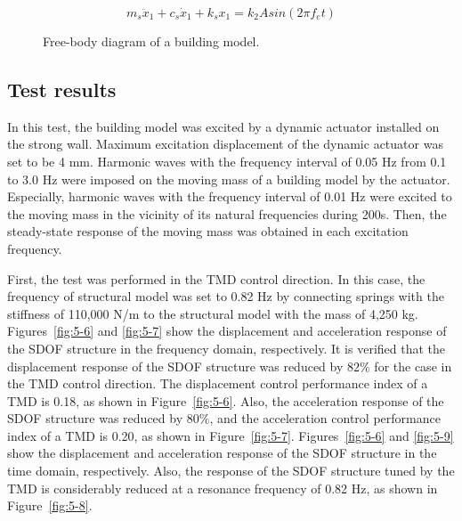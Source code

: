 \begin{equation}\label{eq:5-5}
m_{s}\ddot{x}_{1}+c_{s}\dot{x}_{1}+k_{s}x_{1} = k_{2}A sin \left(2 \pi f_{e} t \right)
\end{equation}

\begin{figure}[!ht]
\centering
{}
\caption{Free-body diagram of a building model.}
\label{fig:5-5}
\end{figure}

\subsection{Test results}
In this test, the building model was excited by a dynamic actuator installed on the strong wall. Maximum excitation displacement of the dynamic actuator was set to be 4 mm. Harmonic waves with the frequency interval of 0.05 Hz from 0.1 to 3.0 Hz were imposed on the moving mass of a building model by the actuator. Especially, harmonic waves with the frequency interval of 0.01 Hz were excited to the moving mass in the vicinity of its natural frequencies during 200s. Then, the steady-state response of the moving mass was obtained in each excitation frequency.

First, the test was performed in the TMD control direction. In this case, the frequency of structural model was set to 0.82 Hz by connecting springs with the stiffness of 110,000 N/m to the structural model with the mass of 4,250 kg. Figures~\ref{fig:5-6} and \ref{fig:5-7} show the displacement and acceleration response of the SDOF structure in the frequency domain, respectively. It is verified that the displacement response of the SDOF structure was reduced by $82\%$ for the case in the TMD control direction. The displacement control performance index of a TMD is 0.18, as shown in Figure~\ref{fig:5-6}. Also, the acceleration response of the SDOF structure was reduced by $80\%$, and the acceleration control performance index of a TMD is 0.20, as shown in Figure~\ref{fig:5-7}. Figures~\ref{fig:5-6} and \ref{fig:5-9} show the displacement and acceleration response of the SDOF structure in the time domain, respectively. Also, the response of the SDOF structure tuned by the TMD is considerably reduced at a resonance frequency of 0.82 Hz, as shown in Figure~\ref{fig:5-8}.

